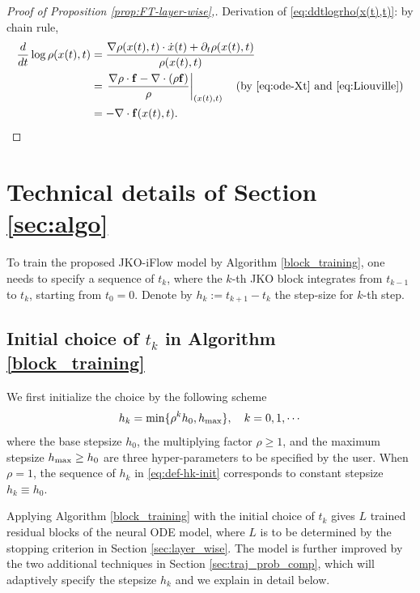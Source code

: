 \documentclass{article}
\theoremstyle{remark}
\theoremstyle{plain}
\newcommand{\JKO}{JKO-iFlow}
\begin{document}
{\begin{proof}[Proof of Proposition \ref{prop:FT-layer-wise},]
{
Derivation of \eqref{eq:ddtlogrho(x(t),t)}:
by chain rule,
\begin{align*}
{\frac{d}{dt}} \log \rho( x(t), t)
& = \frac{ \nabla \rho(x(t),t) \cdot \dot{x}(t)
+ \partial_t \rho(x(t),t)}{\rho( x(t), t)} \\
& = 
\left. \frac{ \nabla \rho  \cdot {\bf f}
 - \nabla \cdot( \rho  {\bf f} ) } 
 {\rho } \right|_{(x(t),t)} 
 \quad \text{(by \eqref{eq:ode-Xt}  and \eqref{eq:Liouville})}\\
 & = - \nabla \cdot {\bf f} (x(t),t).
\end{align*}
}
\end{proof}





\section{Technical details of Section \ref{sec:algo}}
\label{app:detail-algo}


To train the proposed \JKO{} model by Algorithm \ref{block_training}, one needs to specify a sequence of $t_k$, where the $k$-th JKO block integrates from $t_{k-1}$ to $t_{k}$, starting from $t_0=0$. Denote by $h_k:=t_{k+1}-t_k$ the step-size for $k$-th step. 



\subsection{Initial choice of $t_k$ in Algorithm \ref{block_training}}\label{append:tk}


We first initialize the choice by the following scheme
\begin{equation}\label{eq:def-hk-init}
    h_k = \min \{  \rho^{k} h_0, h_{\rm max} \}, 
    \quad k= 0, 1, \cdots  
\end{equation}
where the base stepsize $h_0$,
the multiplying factor $\rho \ge 1$,
and the maximum stepsize  $h_{\rm max} \ge h_0$ 
are three hyper-parameters to be specified by the user.
When $\rho = 1$, the sequence of $h_k$ in \eqref{eq:def-hk-init} corresponds to constant stepsize $h_k \equiv h_0$.

Applying Algorithm \ref{block_training} with the initial choice of $t_k$ gives $L$ trained residual blocks of the neural ODE model, where $L$ is to be determined by the stopping criterion in Section \ref{sec:layer_wise}.  
The model is further improved by the two additional techniques in Section \ref{sec:traj_prob_comp}, which will adaptively specify the stepsize $h_k$ and we explain in detail below. 


}
\end{document}
